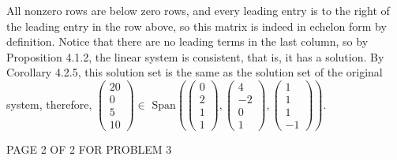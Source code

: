 \documentclass[12pt]{article}
\newenvironment{problem}[2][Problem]
{
	\begin{trivlist} 
		\item[\hskip \labelsep {\bfseries #1 #2:}]
	}
{
	\end{trivlist}
	}
\begin{document}
\begin{problem}{6}
All nonzero rows are below zero rows, and every leading entry is to the right of the leading entry in the row above, so this matrix is indeed in echelon form by definition. Notice that there are no leading terms in the last column, so by Proposition 4.1.2, the linear system is consistent, that is, it has a solution. By Corollary 4.2.5, this solution set is the same as the solution set of the original system, therefore, $\begin{pmatrix} 20\\0\\5\\10\end{pmatrix} \in \text{ Span}\left( \begin{pmatrix} 0\\2\\1\\1 \end{pmatrix}, \begin{pmatrix} 4\\-2\\0\\1 \end{pmatrix}, \begin{pmatrix} 1\\1\\1\\-1 \end{pmatrix} \right)$.
\vfill
\centerline{PAGE 2 OF 2 FOR PROBLEM 3}
\end{problem}
\end{document}
